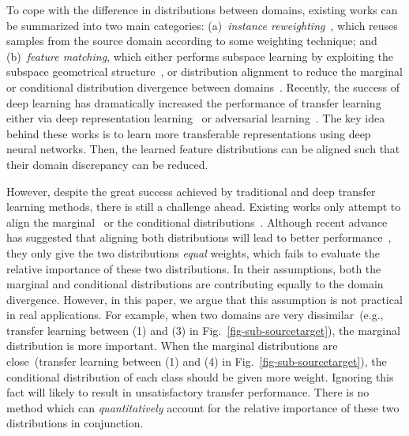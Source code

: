 \documentclass[acmsmall]{acmart}
\begin{document}
To cope with the difference in distributions between domains, existing works can be summarized into two main categories: (a)~\textit{instance reweighting}~\cite{dai2007boosting,xu2017unified}, which reuses samples from the source domain according to some weighting technique; and (b)~\textit{feature matching}, which either performs subspace learning by exploiting the subspace geometrical structure~\cite{wang2019easy,fernando2013unsupervised,sun2016return,gong2012geodesic}, or distribution alignment to reduce the marginal or conditional distribution divergence between domains~\cite{wang2017balanced,zhang2017joint,long2013transfer}. Recently, the success of deep learning has dramatically increased the performance of transfer learning either via deep representation learning~\cite{zhu2019multi,yosinski2014transferable,he2016deep,bousmalis2016domain,long2017deep,wang2018deep} or adversarial learning~\cite{ganin2016domain,ganin2014unsupervised,long2018conditional,zhang2018collaborative,sankaranarayanan2017generate}. The key idea behind these works is to learn more transferable representations using deep neural networks. Then, the learned feature distributions can be aligned such that their domain discrepancy can be reduced.

However, despite the great success achieved by traditional and deep transfer learning methods, there is still a challenge ahead. Existing works only attempt to align the marginal~\cite{pan2011domain,tzeng2014deep,long2015learning} or the conditional distributions~\cite{pei2018multi,long2018conditional}. Although recent advance has suggested that aligning both distributions will lead to better performance~\cite{long2013transfer,wang2017balanced,long2017deep}, they only give the two distributions \textit{equal} weights, which fails to evaluate the relative importance of these two distributions. In their assumptions, both the marginal and conditional distributions are contributing equally to the domain divergence. However, in this paper, we argue that this assumption is not practical in real applications. For example, when two domains are very dissimilar~(e.g., transfer learning between (1) and (3) in Fig.~\ref{fig-sub-sourcetarget}), the marginal distribution is more important. When the marginal distributions are close~(transfer learning between (1) and (4) in Fig.~\ref{fig-sub-sourcetarget}), the conditional distribution of each class should be given more weight. Ignoring this fact will likely to result in unsatisfactory transfer performance. There is no method which can \textit{quantitatively} account for the relative importance of these two distributions in conjunction.
\end{document}

